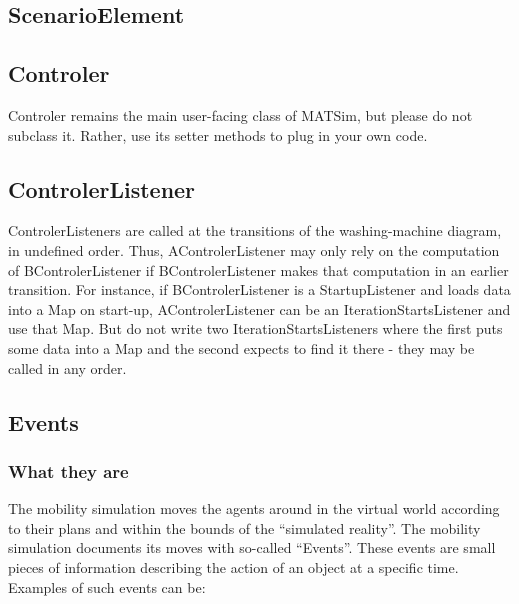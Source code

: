 \subsection{ScenarioElement}

\subsection{Controler}
\label{sec:controlerextension}
Controler remains the main user-facing class of MATSim, but please do not subclass it. Rather,
use its setter methods to plug in your own code.

\subsection{ControlerListener}

ControlerListeners are called at the transitions of the washing-machine diagram, in undefined order.
Thus, AControlerListener may only rely on the computation of BControlerListener if BControlerListener
 makes that computation in an earlier transition. For instance, if BControlerListener is a StartupListener
 and loads data into a Map on start-up, AControlerListener can be an IterationStartsListener and use that Map.
 But do not write two IterationStartsListeners where the first puts some data into a Map and the second expects
 to find it there - they may be called in any order.

\subsection{Events}
\label{sec:events}
\subsubsection{What they are}
The mobility simulation moves the agents around in the virtual world according to their plans and within the bounds of the ``simulated reality''. The mobility simulation documents its moves with so-called ``Events''. These events are small pieces of information describing the action of an object at a specific time. Examples of such events can be:

